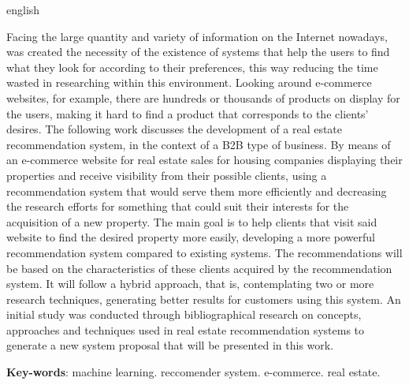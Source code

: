 \begin{resumo}[Abstract]
 \begin{otherlanguage*}{english}

Facing the large quantity and variety of information on the Internet nowadays, was created the necessity of the existence of systems that help the users to find what they look for according to their preferences, this way reducing the time wasted in researching within this environment. Looking around e-commerce websites, for example, there are hundreds or thousands of products on display for the users, making it hard to find a product that corresponds to the clients' desires. The following work discusses the development of a real estate recommendation system, in the context of a B2B type of business. By means of an e-commerce website for real estate sales for housing companies displaying their properties and receive visibility from their possible clients, using a recommendation system that would serve them more efficiently and decreasing the research efforts for something that could suit their interests for the acquisition of a new property. The main goal is to help clients that visit said website to find the desired property more easily, developing a more powerful recommendation system compared to existing systems. The recommendations will be based on the characteristics of these clients acquired by the recommendation system. It will follow a hybrid approach, that is, contemplating two or more research techniques, generating better results for customers using this system. An initial study was conducted through bibliographical research on concepts, approaches and techniques used in real estate recommendation systems to generate a new system proposal that will be presented in this work.

   \vspace{\onelineskip}
 
   \noindent 
   \textbf{Key-words}: machine learning. reccomender system. e-commerce. real estate.
 \end{otherlanguage*}
\end{resumo}
